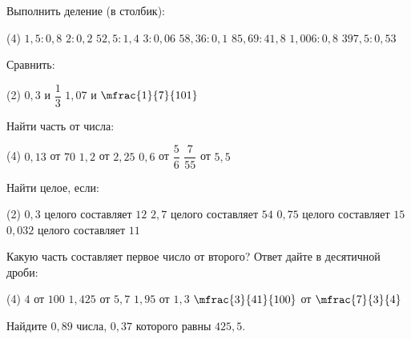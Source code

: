 \begin{homework}[number=1]
	\begin{listofex}
		\item Выполнить деление (в столбик):
		\begin{tasks}(4)
			\task \( 1,5:0,8 \)
			\task \( 2:0,2 \)
			\task \( 52,5:1,4 \)
			\task \( 3:0,06 \)
			\task \( 58,36:0,1 \)
			\task \( 85,69:41,8 \)
			\task \( 1,006:0,8 \)
			\task \( 397,5:0,53 \)
		\end{tasks}
		\item Сравнить:
		\begin{tasks}(2)
			\task \( 0,3 \) и \( \dfrac{1}{3} \)
			\task \( 1,07 \) и \( \mfrac{1}{7}{101} \)
		\end{tasks}
		\item Найти часть от числа:
		\begin{tasks}(4)
			\task \( 0,13 \) от \( 70 \)
			\task \( 1,2 \) от \( 2,25 \)
			\task \( 0,6 \) от \( \dfrac{5}{6} \)
			\task \( \dfrac{7}{55} \) от \( 5,5 \)
		\end{tasks}
		\item Найти целое, если:
		\begin{tasks}(2)
			\task \( 0,3 \) целого составляет \( 12 \)
			\task \( 2,7 \) целого составляет \( 54 \)
			\task \( 0,75 \) целого составляет \( 15 \)
			\task \( 0,032 \) целого составляет \( 11 \)
		\end{tasks}
		\item Какую часть составляет первое число от второго? Ответ дайте в десятичной дроби:
		\begin{tasks}(4)
			\task \( 4 \) от \( 100 \)
			\task \( 1,425 \) от \( 5,7 \)
			\task \( 1,95 \) от \( 1,3 \)
			\task \( \mfrac{3}{41}{100} \) от \( \mfrac{7}{3}{4} \)
		\end{tasks}
		\item Найдите \( 0,89 \) числа, \( 0,37 \) которого равны \( 425,5 \).
	\end{listofex}
\end{homework}
%
%

